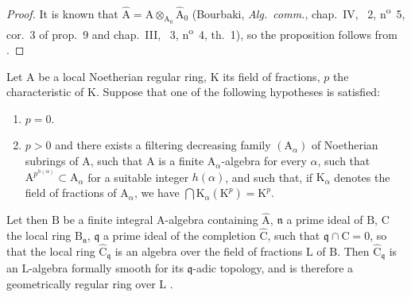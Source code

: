 \begin{proof}
It is known that $\widehat{\mathrm{A}}=\mathrm{A}\otimes_{\mathrm{A}_0}\widehat{\mathrm{A}}_0$ (Bourbaki, \emph{Alg.~comm.}, chap.~IV, \textsection~2, n\textsuperscript{o}~5, cor.~3 of prop.~9 and chap.~III, \textsection~3, n\textsuperscript{o}~4, th.~1), so the proposition follows from .
\end{proof}

\begin{proposition}[22.3.2]
\label{0.22.3.2}
Let $\mathrm{A}$ be a local Noetherian regular ring, $\mathrm{K}$ its field of fractions, $p$ the characteristic of $\mathrm{K}$.
Suppose that one of the following hypotheses is satisfied:
\begin{enumerate}
  \item[\rm{(i)}] $p=0$.
  \item[\rm{(ii)}] $p>0$ and there exists a filtering decreasing family $(\mathrm{A}_\alpha)$ of Noetherian subrings of $\mathrm{A}$, such that $\mathrm{A}$ is a finite $\mathrm{A}_\alpha$-algebra for every $\alpha$, such that $\mathrm{A}^{p^{h(\alpha)}}\subset\mathrm{A}_\alpha$ for a suitable integer $h(\alpha)$, and such that, if $\mathrm{K}_\alpha$ denotes the field of fractions of $\mathrm{A}_\alpha$, we have $\bigcap\mathrm{K}_\alpha(\mathrm{K}^p)=\mathrm{K}^p$.
\end{enumerate}

Let then $\mathrm{B}$ be a finite integral $\mathrm{A}$-algebra containing $\widehat{\mathrm{A}}$, $\mathfrak{n}$ a prime ideal of $\mathrm{B}$, $\mathrm{C}$ the local ring $\mathrm{B}_\mathfrak{n}$, $\mathfrak{q}$ a prime ideal of the completion $\widehat{\mathrm{C}}$, such that $\mathfrak{q}\cap\mathrm{C}=0$, so that the local ring $\widehat{\mathrm{C}}_\mathfrak{q}$ is an algebra over the field of fractions $\mathrm{L}$ of $\mathrm{B}$.
Then $\widehat{\mathrm{C}}_\mathfrak{q}$ is an $\mathrm{L}$-algebra formally smooth for its $\mathfrak{q}$-adic topology, and is therefore a geometrically regular ring over $\mathrm{L}$ .
\end{proposition}

